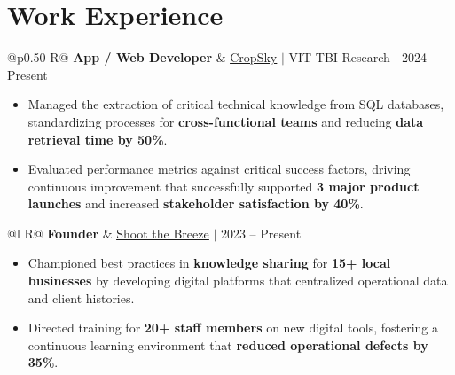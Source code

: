 \documentclass[a4paper,10pt]{article}
\newcommand{\ulink}[2]{\href{#1}{\uline{#2}}}
\newcommand{\subheading}[1]{{\color[HTML]{0A0A0A}\fontsize{12}{14}\selectfont\bfseries #1}}
\newcommand{\meta}[1]{{\color[HTML]{5C5C5C}\fontsize{10.5}{12.5}\selectfont #1}}
\begin{document}
\vspace{2pt}

\section{Work Experience}
\vspace{2pt}

\begin{tabularx}{\linewidth}{@{}p{0.50\linewidth} R@{}}
\subheading{App / Web Developer} & \meta{\ulink{https://sites.google.com/view/cropsky/home}{CropSky} $|$ VIT-TBI Research $|$ 2024 -- Present}
\end{tabularx}
\begin{itemize}[nosep, leftmargin=1.5em, itemsep=1pt, topsep=2pt]
  \item {\color[HTML]{0A0A0A}\fontsize{11}{14}\selectfont Managed the extraction of critical technical knowledge from SQL databases, standardizing processes for \textbf{cross-functional teams} and reducing \textbf{data retrieval time by 50\%}.}
  \item {\color[HTML]{0A0A0A}\fontsize{11}{14}\selectfont Evaluated performance metrics against critical success factors, driving continuous improvement that successfully supported \textbf{3 major product launches} and increased \textbf{stakeholder satisfaction by 40\%}.}
\end{itemize}

\vspace{2pt}

\begin{tabularx}{\linewidth}{@{}l R@{}}
\subheading{Founder} & \meta{\ulink{https://shoot-the-breeze.vercel.app}{Shoot the Breeze} $|$ 2023 -- Present}
\end{tabularx}
\begin{itemize}[nosep, leftmargin=1.5em, itemsep=1pt, topsep=2pt]
  \item {\color[HTML]{0A0A0A}\fontsize{11}{14}\selectfont Championed best practices in \textbf{knowledge sharing} for \textbf{15+ local businesses} by developing digital platforms that centralized operational data and client histories.}
  \item {\color[HTML]{0A0A0A}\fontsize{11}{14}\selectfont Directed training for \textbf{20+ staff members} on new digital tools, fostering a continuous learning environment that \textbf{reduced operational defects by 35\%}.}
\end{itemize}

\vspace{2pt}
\end{document}
